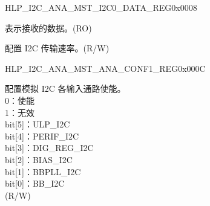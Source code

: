 \begin{register}{H}{LP\_I2C\_ANA\_MST\_I2C0\_DATA\_REG}{0x0008}\label{regdesc:LPI2CANAMSTI2C0DATAREG}
%
%
%
\regnewline%
\begin{regdesc}\begin{reglist}
\label{fielddesc:LPI2CANAMSTI2C0RDATA}\item [LP\_I2C\_ANA\_MST\_I2C0\_RDATA] 表示接收的数据。(RO)
\label{fielddesc:LPI2CANAMSTI2C0CLKSEL}\item [LP\_I2C\_ANA\_MST\_I2C0\_CLK\_SEL] 配置 I2C 传输速率。(R/W)
\end{reglist}\end{regdesc}
\end{register}


\begin{register}{H}{LP\_I2C\_ANA\_MST\_ANA\_CONF1\_REG}{0x000C}\label{regdesc:LPI2CANAMSTANACONF1REG}
%
%
\regnewline%
\begin{regdesc}\begin{reglist}
\label{fielddesc:LPI2CANAMSTANACONF1}\item [LP\_I2C\_ANA\_MST\_ANA\_CONF1] 配置模拟 I2C 各输入通路使能。\\
0：使能\\
1：无效\\
bit[5]：ULP\_I2C\\
bit[4]：PERIF\_I2C\\
bit[3]：DIG\_REG\_I2C\\
bit[2]：BIAS\_I2C\\
bit[1]：BBPLL\_I2C\\
bit[0]：BB\_I2C\\
(R/W)
\end{reglist}\end{regdesc}
\end{register}


